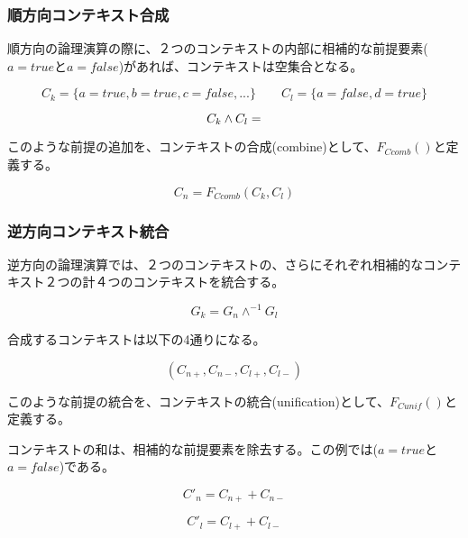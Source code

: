 \documentclass[12pt]{article}
\begin{document}
\subsubsection{順方向コンテキスト合成}\label{ux9806ux65b9ux5411ux30b3ux30f3ux30c6ux30adux30b9ux30c8ux5408ux6210}

順方向の論理演算の際に、２つのコンテキストの内部に相補的な前提要素(\(a=true\)と\(a=false\))があれば、コンテキストは空集合となる。

\begin{equation} C_{k}=\{a=true,b=true,c=false,...\} \qquad C_{l}=\{a=false,d=true\} \end{equation}

\begin{equation}C_{k} \wedge C_{l} = \empty\end{equation}

このような前提の追加を、コンテキストの合成(combine)として、\(F_{Ccomb}()\)と定義する。

\begin{equation} C_{n} = F_{Ccomb}(C_{k} , C_{l})\end{equation}

\subsubsection{逆方向コンテキスト統合}\label{ux9006ux65b9ux5411ux30b3ux30f3ux30c6ux30adux30b9ux30c8ux7d71ux5408}

逆方向の論理演算では、２つのコンテキストの、さらにそれぞれ相補的なコンテキスト２つの計４つのコンテキストを統合する。

\begin{equation} G_{k} = G_{n} \wedge^{-1} G_{l}\end{equation}

合成するコンテキストは以下の4通りになる。

\begin{equation} (C_{n+} , C_{n-} ,  C_{l+} ,  C_{l-})\end{equation}

このような前提の統合を、コンテキストの統合(unification)として、\(F_{Cunif}()\)と定義する。

コンテキストの和は、相補的な前提要素を除去する。この例では(\(a=true\)と\(a=false\))である。

\begin{equation} C'_{n}= C_{n+} + C_{n-}\end{equation}

\begin{equation} C'_{l} = C_{l+} + C_{l-} \end{equation}
\end{document}

